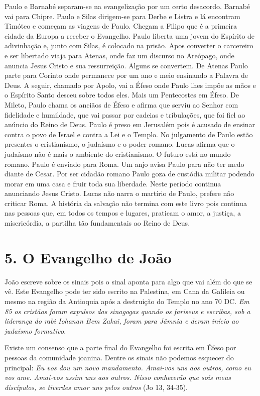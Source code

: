 \documentclass[
]{book}
\begin{document}
Paulo e Barnabé separam-se na evangelização por um certo desacordo. Barnabé vai para Chipre. Paulo e Silas dirigem-se para Derbe e Listra e lá encontram Timóteo e começam as viagens de Paulo. Chegam a Filipo que é a primeira cidade da Europa a receber o Evangelho. Paulo liberta uma jovem do Espírito de adivinhação e, junto com Silas, é colocado na prisão. Apos converter o carcereiro e ser libertado viaja para Atenas, onde faz um discurso no Areópago, onde anuncia Jesus Cristo e sua ressurreição. Alguns se convertem. De Atenas Paulo parte para Corinto onde permanece por um ano e meio ensinando a Palavra de Deus. A seguir, chamado por Apolo, vai a Éfeso onde Paulo lhes impõe as mãos e o Espírito Santo desceu sobre todos eles. Mais um Pentecostes em Éfeso. De Mileto, Paulo chama os anciãos de Éfeso e afirma que serviu ao Senhor com fidelidade e humildade, que vai passar por cadeias e tribulações, que foi fiel ao anúncio do Reino de Deus. Paulo é preso em Jerusalém pois é acusado de ensinar contra o povo de Israel e contra a Lei e o Templo. No julgamento de Paulo estão presentes o cristianismo, o judaísmo e o poder romano. Lucas afirma que o judaísmo não é mais o ambiente do cristianismo. O futuro está no mundo romano. Paulo é enviado para Roma. Um anjo avisa Paulo para não ter medo diante de Cesar. Por ser cidadão romano Paulo goza de custódia militar podendo morar em uma casa e fruir toda sua liberdade. Neste período continua anunciando Jesus Cristo. Lucas não narra o martírio de Paulo, prefere não criticar Roma. A história da salvação não termina com este livro pois continua nas pessoas que, em todos os tempos e lugares, praticam o amor, a justiça, a misericórdia, a partilha tão fundamentais ao Reino de Deus.

\hypertarget{o-evangelho-de-jouxe3o}{%
\section*{5. O Evangelho de João}\label{o-evangelho-de-jouxe3o}}

João escreve sobre os sinais pois o sinal aponta para algo que vai além do que se vê. Este Evangelho pode ter sido escrito na Palestina, em Cana da Galileia ou mesmo na região da Antioquia após a destruição do Templo no ano 70 DC. \emph{Em 85 os cristãos foram expulsos das sinagogas quando os fariseus e escribas, sob a liderança do rabi Iohanan Bem Zakai, foram para Jâmnia e deram início ao judaísmo formativo}.

Existe um consenso que a parte final do Evangelho foi escrita em Éfeso por pessoas da comunidade joanina. Dentre os sinais não podemos esquecer do principal: \emph{Eu vos dou um novo mandamento. Amai-vos uns aos outros, como eu vos ame. Amai-vos assim uns aos outros. Nisso conhecerão que sois meus discípulos, se tiverdes amor uns pelos outros} (Jo 13, 34-35).
\end{document}
